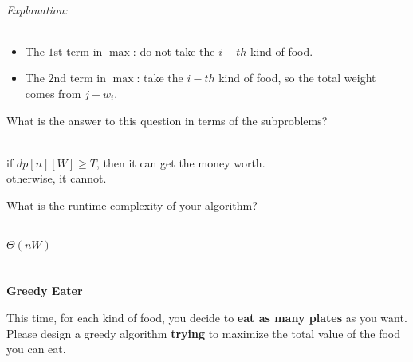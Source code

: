 \begin{parts}
\begin{subparts}
\begin{solution}
			\paragraph{Explanation:}
			\begin{itemize}
				\item The $1$st term in $\max$: do not take the $i-th$ kind of food.
				\item The $2$nd term in $\max$: take the $i-th$ kind of food, so the total weight comes from $j-w_i$.
			\end{itemize}

		\end{solution}

		\subpart[2] What is the answer to this question in terms of the subproblems?
		\begin{solution}
			\\if $dp[n][W] \geq T$, then it can get the money worth.\\
			otherwise, it cannot.
		\end{solution}

		\subpart[1] What is the runtime complexity of your algorithm?
		\begin{solution}
			\\$\Theta(nW)$
		\end{solution}
	\end{subparts}

	\newpage

	\part{} \textbf{Greedy Eater} \par
	This time, for each kind of food, you decide to \textbf{eat as many plates} as you want. Please design a greedy algorithm \textbf{trying} to maximize the total value of the food you can eat.


\end{parts}
